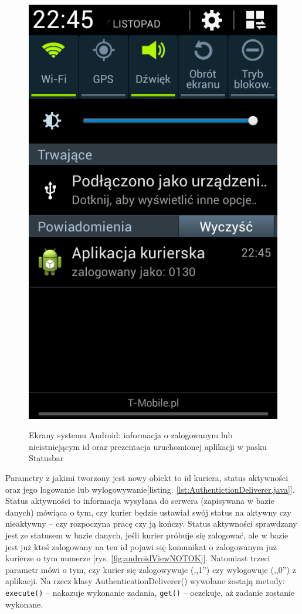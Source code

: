 \documentclass[eng,printmode,oneside]{mgr}
\begin{document}
\begin{figure}
{\includegraphics[height=0.35\textheight]{andBarZal.png}
\label{fig:androidViewtask}
}
\caption{Ekrany systemu Android: informacja o zalogowanym lub nieistniejącym
id oraz prezentacja uruchomionej aplikacji w pasku Statusbar}
\end{figure}

Parametry z jakimi tworzony jest
nowy obiekt to id kuriera, status aktywności oraz jego logowanie lub
wylogowywanie[listing. \ref{lst:AuthentictionDeliverer.java}]. Status aktywności to
informacja wysyłana do serwera (zapisywana w bazie danych) mówiąca o tym, czy kurier będzie ustawiał swój status na aktywny
czy nieaktywny -- czy rozpoczyna pracę czy ją kończy. Status aktywności
sprawdzany jest ze statusem w bazie danych, jeśli kurier próbuje się zalogować,
ale w bazie jest już ktoś zalogowany na ten id pojawi się komunikat o
zalogowanym już kurierze o tym numerze [rys. \ref{fig:androidViewNOTOK}].
Natomiast trzeci parametr mówi o tym, czy kurier się zalogowywuje (,,1'') czy
wylogowuje (,,0'') z aplikacji. Na rzecz klasy AuthenticationDeliverer()
wywołane zostają metody:
\texttt{execute()} -- nakazuje wykonanie zadania, \texttt{get()} -- oczekuje, aż
zadanie zostanie wykonane.
\end{document}

